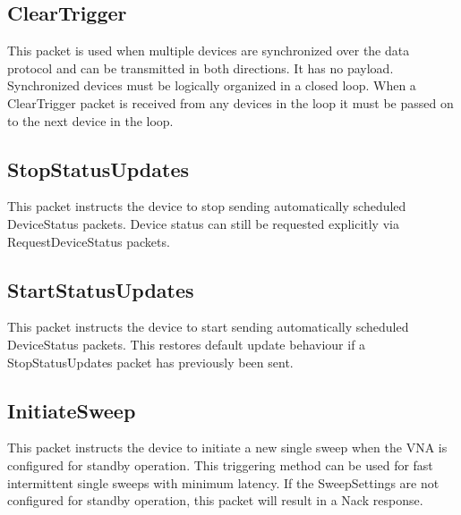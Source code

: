 \documentclass[a4paper,11pt]{article}
\begin{document}
\subsection{ClearTrigger}
This packet is used when multiple devices are synchronized over the data protocol and can be transmitted in both directions. It has no payload. Synchronized devices must be logically organized in a closed loop. When a ClearTrigger packet is received from any devices in the loop it must be passed on to the next device in the loop.

\subsection{StopStatusUpdates}
This packet instructs the device to stop sending automatically scheduled DeviceStatus packets. Device status can still be requested explicitly via RequestDeviceStatus packets.

\subsection{StartStatusUpdates}
This packet instructs the device to start sending automatically scheduled DeviceStatus packets. This restores default update behaviour if a StopStatusUpdates packet has previously been sent.

\subsection{InitiateSweep}
This packet instructs the device to initiate a new single sweep when the VNA is configured for standby operation. This triggering method can be used for fast intermittent single sweeps with minimum latency. If the SweepSettings are not configured for standby operation, this packet will result in a Nack response.
\end{document}
